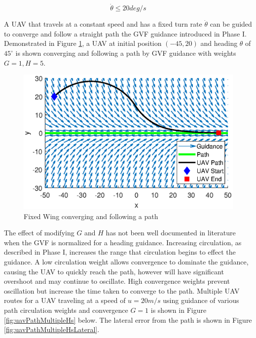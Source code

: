 \documentclass[numbered,pdftex]{ohio-etd}
\begin{document}
\begin{equation}
\label{turnRate}
\dot{\theta} \leq 20 deg/s
\end{equation}

A UAV that travels at a constant speed and has a fixed turn rate $\dot{\theta}$ can be guided to converge and follow a straight path the GVF guidance introduced in Phase I. Demonstrated in Figure \ref{fig:uavPathFollowDemo}, a UAV at initial position $(-45,20)$ and heading $\theta$ of $45^\circ$ is shown converging and following a path by GVF guidance with weights $G=1,H=5$.


\begin{figure}[H]
	\centering
	\includegraphics[trim=0 25 0 45,clip,width=14cm]{PaperFigures/Methods/uavPathFollowDemo}
	\caption{Fixed Wing converging and following a path}
	\label{fig:uavPathFollowDemo}
\end{figure}

The effect of modifying $G$ and $H$ has not been well documented in literature when the GVF is normalized for a heading guidance. Increasing circulation, as described in Phase I, increases the range that circulation begins to effect the guidance.  A low circulation weight allows convergence to dominate the guidance, causing the UAV to quickly reach the path, however will have significant overshoot and may continue to oscillate. High convergence weights prevent oscillation but increase the time taken to converge to the path. Multiple UAV routes for a UAV traveling at a speed of $u=20m/s$ using guidance of various path circulation weights and convergence $G=1$ is shown in Figure \ref{fig:uavPathMultipleHs} below. The lateral error from the path is shown in Figure \ref{fig:uavPathMultipleHsLateral}. 
\end{document}
